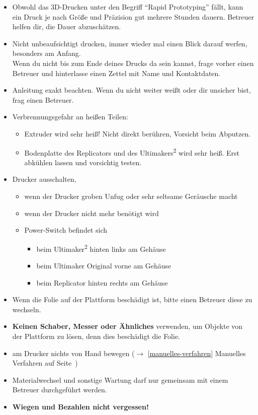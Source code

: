 \documentclass{\basedir/fablab-document}
\newcommand{\ts}[1]{\textsuperscript{#1}}
\begin{document}
\begin{itemize}
 \item Obwohl das 3D-Drucken unter den Begriff ``Rapid Prototyping'' fällt, kann ein Druck je nach Größe und
 Präzision gut mehrere Stunden dauern. Betreuer helfen dir, die Dauer abzuschätzen.
 \item Nicht unbeaufsichtigt drucken, immer wieder mal einen Blick darauf werfen, besonders am Anfang.\\
Wenn du nicht bis zum Ende deines Drucks da sein kannst, frage vorher einen Betreuer und hinterlasse einen Zettel mit Name und Kontaktdaten.
 \item Anleitung exakt beachten. Wenn du nicht weiter weißt oder dir unsicher bist, frag einen Betreuer.
 \item Verbrennungsgefahr an heißen Teilen:
  \begin{itemize}
   \item Extruder wird sehr heiß! Nicht direkt berühren, Vorsicht beim Abputzen.
   \item Bodenplatte des Replicators und des Ultimakers\ts2 wird sehr heiß. Erst abkühlen lassen und vorsichtig testen.
  \end{itemize}
 \item Drucker ausschalten,
 \begin{itemize}
  \item wenn der Drucker groben Unfug oder sehr seltsame Geräusche macht
  \item wenn der Drucker nicht mehr benötigt wird
  \item Power-Switch befindet sich
  \begin{itemize}
   \item beim Ultimaker\ts2 hinten links am Gehäuse
   \item beim Ultimaker Original vorne am Gehäuse
   \item beim Replicator hinten rechts am Gehäuse
  \end{itemize}
 \end{itemize}
 \item Wenn die Folie auf der Plattform beschädigt ist, bitte einen Betreuer diese zu wechseln.
 \item \textbf{Keinen Schaber, Messer oder Ähnliches} verwenden, um Objekte von der Plattform zu lösen, denn dies beschädigt die Folie.
 \item am Drucker nichts von Hand bewegen ($\to$ \ref{manuelles-verfahren} Manuelles Verfahren auf Seite\, \pageref{manuelles-verfahren})
 \item Materialwechsel und sonstige Wartung darf nur gemeinsam mit einem Betreuer durchgeführt werden.
 \item \textbf{Wiegen und Bezahlen nicht vergessen!}
\end{itemize}
\newpage
\end{document}
